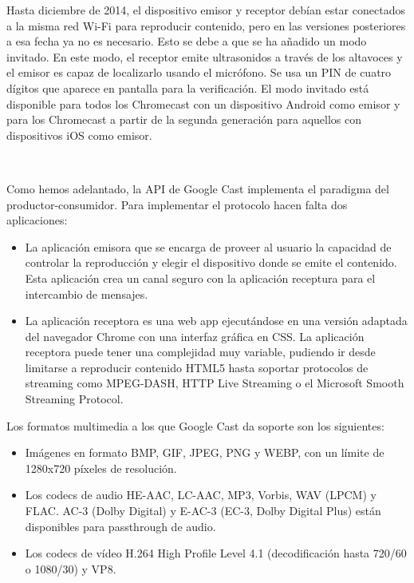 Hasta diciembre de 2014, el dispositivo emisor y receptor debían estar conectados a la misma red Wi-Fi para reproducir contenido, pero en las versiones posteriores a esa fecha ya no es necesario.
Esto se debe a que se ha añadido un modo invitado.
En este modo, el receptor emite ultrasonidos a través de los altavoces y el emisor es capaz de localizarlo usando el micrófono.
Se usa un PIN de cuatro dígitos que aparece en pantalla para la verificación.
El modo invitado está disponible para todos los Chromecast con un dispositivo Android como emisor y para los Chromecast a partir de la segunda generación para aquellos con dispositivos iOS como emisor.

\

Como hemos adelantado, la API de Google Cast implementa el paradigma del productor-consumidor. Para implementar el protocolo hacen falta dos aplicaciones:

\begin{itemize}

	\item La aplicación emisora que se encarga de proveer al usuario la capacidad de controlar la reproducción y elegir el dispositivo donde se emite el contenido.
	Esta aplicación crea un canal seguro con la aplicación receptura para el intercambio de mensajes.

	\item La aplicación receptora es una web app ejecutándose en una versión adaptada del navegador Chrome con una interfaz gráfica en CSS.
	La aplicación receptora puede tener una complejidad muy variable, pudiendo ir desde limitarse a reproducir contenido HTML5 hasta soportar protocolos de streaming como MPEG-DASH, HTTP Live Streaming o el Microsoft Smooth Streaming Protocol\cite{DLNA-Miracast}.

\end{itemize}

Los formatos multimedia a los que Google Cast da soporte son los siguientes:

\begin{itemize}

	\item Imágenes en formato BMP, GIF, JPEG, PNG y WEBP, con un límite de 1280x720 píxeles de resolución.

	\item Los codecs de audio HE-AAC, LC-AAC, MP3, Vorbis, WAV (LPCM) y FLAC. AC-3 (Dolby Digital) y E-AC-3 (EC-3, Dolby Digital Plus) están disponibles para passthrough de audio.

	\item Los codecs de vídeo H.264 High Profile Level 4.1 (decodificación hasta 720/60 o 1080/30) y VP8.

\end{itemize}

